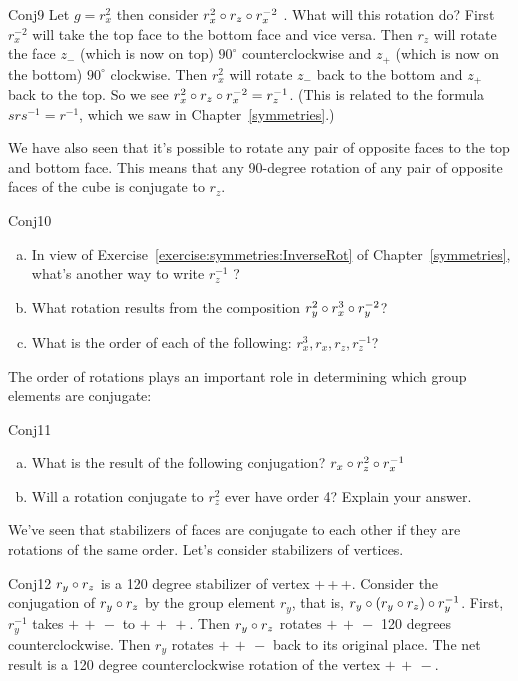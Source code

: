 \begin {example}{Conj9} 
Let  $g=r_x^2$ then consider $r_x^2\circ r_z\circ r_x^{-2}$ .   What will this rotation do? First $r_x^{-2}$ will take the top face to the bottom face and vice versa. Then $r_z$ will rotate the face $z_-$ (which is now on top)   $90^{\circ}$ counterclockwise and  $z_+$ (which is now on the bottom)  $90^{\circ}$ clockwise.  Then $r_x^2$ will rotate $z_-$ back to the bottom and $z_+$ back to the top.  So we see $r_x^2\circ r_z\circ r_x^{-2} = r_z^{-1}$. (This is related to the formula $s r s^{-1} = r^{-1}$, which we saw in Chapter~\ref{symmetries}.)  
\end{example}

We have also seen that it's possible to rotate any pair of opposite faces to the top and bottom face. This means that any 90-degree rotation of any pair of opposite faces of the cube is conjugate to $r_z$.  

\begin {exercise}{Conj10}
\begin {enumerate} [(a)]
\item In view of Exercise~\ref{exercise:symmetries:InverseRot} of Chapter~\ref{symmetries}, what's another way to write $r_z^{-1}$ ?  
\item What rotation results from the composition  $r_y^2\circ r_x^3\circ r_y^{-2}$?
\item What is the order of each of the following: $r_x^3, r_x, r_z, r_z^{-1}$? 
\end{enumerate}
\end{exercise}

The order of rotations plays an important role in determining which group elements are conjugate:

\begin {exercise}{Conj11}
\begin {enumerate}[(a)]
\item What is the result of the following conjugation? $r_x\circ r_z^2 \circ r_x^{-1}$
\item Will a rotation conjugate to $r_z^2$ ever have order 4?  Explain your answer.
\end {enumerate}
\end{exercise}

We've seen that stabilizers of faces are conjugate to each other if they are rotations of the same order.  Let's consider stabilizers of vertices.

\begin {example}{Conj12}
 $r_y\circ r_z$ is a 120 degree stabilizer of vertex {+\,+\,+}.  Consider the conjugation of $r_y\circ r_z$ by the group element $r_y$, that is,  $r_y\circ (r_y\circ r_z)\circ r_y^{-1}$. First, $r_y^{-1}$ takes ${+\,+\,-}$ to ${+\,+\,+}$.  Then $r_y\circ r_z$ rotates ${+\,+\,-}$ 120 degrees counterclockwise. Then $r_y$ rotates ${+\,+\,-}$ back to its original place.  The net result is a 120 degree counterclockwise rotation of the vertex ${+\,+\,-}$.
\end{example}


